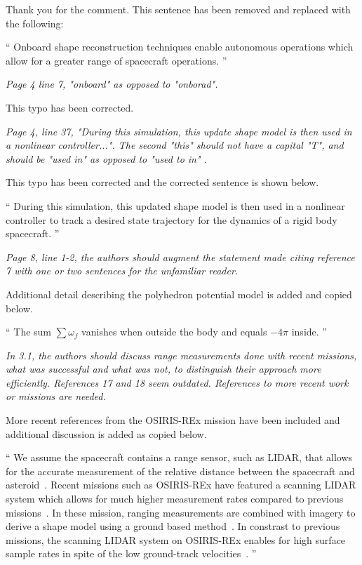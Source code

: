 \documentclass[11pt]{article}
\newenvironment{correction}{\begin{list}{}{\setlength{\leftmargin}{1cm}\setlength{\rightmargin}{1cm}}\vspace{\parsep}\item[]``}{''\end{list}}
\newcommand{\comment}[1]{\item \itshape #1 \normalfont}
\begin{document}
\begin{itemize}
Thank you for the comment.
This sentence has been removed and replaced with the following:


\begin{correction}
Onboard shape reconstruction techniques enable autonomous operations which allow for a greater range of spacecraft operations.
\end{correction}


\comment{
Page 4 line 7, "onboard" as opposed to "onborad".
}

This typo has been corrected.


\comment{
Page 4, line 37, "During this simulation, this update shape model is then used in a nonlinear controller...". The second "this" should not have a capital "T", and should be "used in" as opposed to "used to in" .
}

This typo has been corrected and the corrected sentence is shown below.

\begin{correction}
During this simulation, this updated shape model is then used in a nonlinear controller to track a desired state trajectory for the dynamics of a rigid body spacecraft.
\end{correction}

\comment{
Page 8, line 1-2, the authors should augment the statement made citing reference 7 with one or two sentences for the unfamiliar reader.  
}

Additional detail describing the polyhedron potential model is added and copied below.

\begin{correction}
    The sum \( \sum \omega_f \) vanishes when outside the body and equals \( -4 \pi \) inside.
\end{correction}

\comment{
In 3.1, the authors should discuss range measurements done with recent missions, what was successful and what was not, to distinguish their approach more efficiently. 
References 17 and 18 seem outdated. 
References to more recent work or missions are needed.
}

More recent references from the OSIRIS-REx mission have been included and additional discussion is added as copied below.

\begin{correction}
We assume the spacecraft contains a range sensor, such as LIDAR, that allows for the accurate measurement of the relative distance between the spacecraft and asteroid~\cite{zuber1997,zuber2000}.
Recent missions such as OSIRIS-REx have featured a scanning LIDAR system which allows for much higher measurement rates compared to previous missions~\cite{lauretta2017,daly2017}.
In these mission, ranging measurements are combined with imagery to derive a shape model using a ground based method~\cite{gaskell2008}.
In constrast to previous missions, the scanning LIDAR system on OSIRIS-REx enables for high surface sample rates in spite of the low ground-track velocities~\cite{daly2017}.
\end{correction}


\end{itemize}
\end{document}
